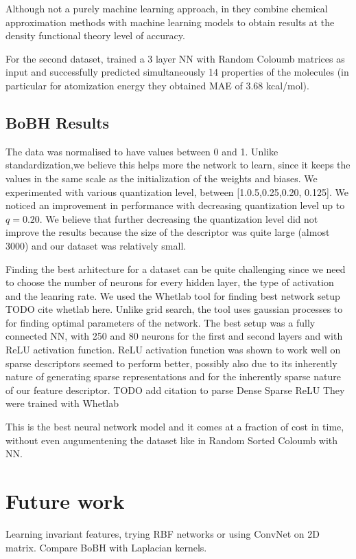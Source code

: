 \documentclass{article}
\begin{document}
Although not a purely machine learning approach, in \cite{falsebigdata} they combine chemical approximation methods with machine learning models to obtain results at the density functional theory level of accuracy.

For the second dataset,\cite{montavon2012learning} trained a 3 layer NN with Random Coloumb matrices as input and successfully predicted simultaneously 14 properties of the molecules (in particular for atomization energy they obtained MAE of 3.68 kcal/mol).


\subsection{BoBH Results}
The data was normalised to have values between 0 and 1. Unlike standardization,we believe this helps more the network to learn, since it keeps the values in the same scale as the initialization of the weights and biases.
We experimented with various quantization level, between [1.0.5,0.25,0.20, 0.125]. We noticed an improvement in performance with decreasing quantization level up to  $q=0.20$. We believe that further decreasing the quantization level did not improve the results because the size of the descriptor was quite large (almost 3000) and our dataset was relatively small. 

Finding the best arhitecture for a dataset can be quite challenging since we need to choose the number of neurons for every hidden layer, the type of activation and the leanring rate.
We used the Whetlab tool for finding best network setup TODO cite whetlab here. Unlike grid search, the tool uses gaussian processes to for finding optimal parameters of the network.
The best setup was a fully connected NN, with 250 and 80 neurons for the first and second layers and with ReLU activation function. 
ReLU activation function was shown to work well on sparse descriptors seemed to perform better, possibly also due to its inherently nature of generating sparse representations and for the inherently sparse nature of our feature descriptor.
TODO add citation to parse Dense Sparse ReLU
They were trained with Whetlab \cite{whetlab}

This is the best neural network model and it comes at a fraction of cost in time, without even augumentening the dataset like in Random Sorted Coloumb with NN.

\section{Future work}
Learning invariant features, trying RBF networks or using ConvNet on 2D matrix.
Compare BoBH with Laplacian kernels.
\end{document}
